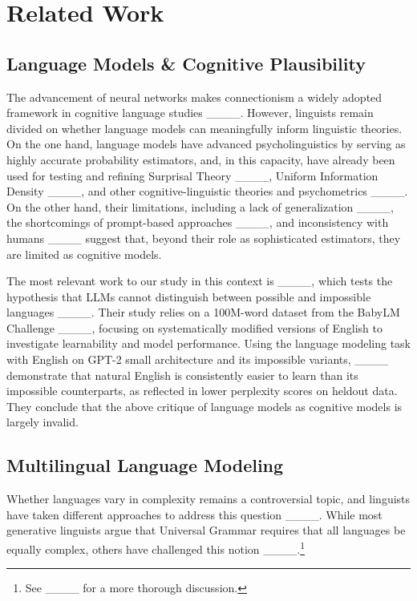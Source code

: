 \section{Related Work}
\label{literature_review}
\subsection{Language Models \& Cognitive Plausibility}
The advancement of neural networks makes connectionism a widely adopted framework in cognitive language studies ____. However, linguists remain divided on whether language models can meaningfully inform linguistic theories. On the one hand, language models have advanced psycholinguistics by serving as highly accurate probability estimators, and, in this capacity, have already been used for testing and refining Surprisal Theory ____, Uniform Information Density ____, and other cognitive-linguistic theories and psychometrics ____. On the other hand, their limitations, including a lack of generalization ____, the shortcomings of prompt-based approaches ____, and inconsistency with humans ____ suggest that, beyond their role as sophisticated estimators, they are limited as cognitive models.

The most relevant work to our study in this context is ____, which tests the hypothesis that LLMs cannot distinguish between possible and impossible languages ____. Their study relies on a 100M-word dataset from the BabyLM Challenge ____, focusing on systematically modified versions of English to investigate learnability and model performance. Using the language modeling task with English on GPT-2 small architecture and its impossible variants, ____ demonstrate that natural English is consistently easier to learn than its impossible counterparts, as reflected in lower perplexity scores on heldout data. They conclude that the above critique of language models as cognitive models is largely invalid. 

\subsection{Multilingual Language Modeling}

Whether languages vary in complexity remains a controversial topic, and linguists have taken different approaches to address this question ____. While most generative linguists argue that Universal Grammar requires that all languages be equally complex, others have challenged this notion ____.\footnote{See ____ for a more thorough discussion.}

